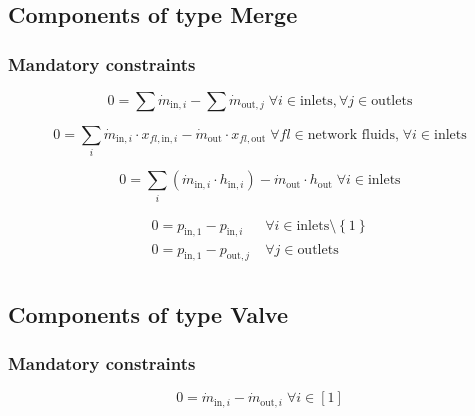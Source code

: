 \subsection{Components of type Merge}

\subsubsection{Mandatory constraints}

\begin{equation}
\label{eq:Merge_mass_flow_constraints}
0 =\sum\dot{m}_{\mathrm{in},i}-\sum\dot{m}_{\mathrm{out},j}\;\forall i \in \text{inlets}, \forall j \in \text{outlets}
\end{equation}

\begin{equation}
\label{eq:Merge_fluid_constraints}
0=\sum_i \dot{m}_{\mathrm{in,}i} \cdot x_{fl\mathrm{,in,}i}- \dot {m}_\mathrm{out} \cdot x_{fl\mathrm{,out}}\; \forall fl \in \text{network fluids,} \; \forall i \in\text{inlets}
\end{equation}

\begin{equation}
\label{eq:Merge_energy_balance_constraints}
0=\sum_i\left(\dot{m}_{\mathrm{in,}i}\cdot h_{\mathrm{in,}i}\right) - \dot{m}_\mathrm{out} \cdot h_\mathrm{out} \; \forall i \in \text{inlets}
\end{equation}

\begin{equation}
\label{eq:Merge_pressure_constraints}
\begin{split}
0 = p_\mathrm{in,1} - p_{\mathrm{in,}i} & \; \forall i \in \text{inlets} \setminus \left\lbrace 1\right\rbrace\\
0 = p_\mathrm{in,1} - p_{\mathrm{out,}j} & \; \forall j \in \text{outlets}\\
\end{split}
\end{equation}


\subsection{Components of type Valve}

\subsubsection{Mandatory constraints}

\begin{equation}
\label{eq:Valve_mass_flow_constraints}
0=\dot{m}_{\mathrm{in,}i}-\dot{m}_{\mathrm{out,}i}\; \forall i \in [1]
\end{equation}

